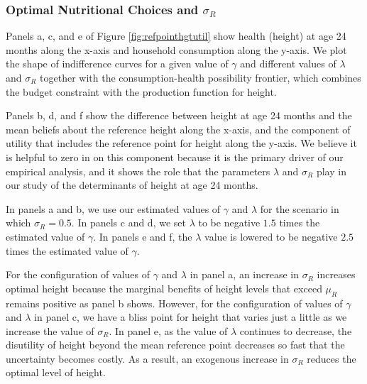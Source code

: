 \subsubsection{Optimal Nutritional Choices and $\sigma_R$\label{sec:sigmaopti}}

Panels a, c, and e of Figure \ref{fig:refpointhgtutil} show health (height) at age 24 months along the x-axis and household consumption along the y-axis. We plot the shape of indifference curves for a given value of $\gamma$ and different values of $\lambda$ and $\sigma_R$ together with the consumption-health possibility frontier, which combines the budget constraint with the production function for height.

Panels b, d, and f show the difference between height at age 24 months and the mean beliefs about the reference height along the x-axis, and the component of utility that  includes the reference point for height along the y-axis. We believe it is helpful to zero in on this component because it is the primary driver of our empirical analysis, and it shows the role that the parameters $\lambda$ and $\sigma_R$ play in our study of the determinants of height at age 24 months.

In panels a and b, we use our estimated values of $\gamma$ and $\lambda$ for the scenario in which $\sigma_R = 0.5$. In panels c and d, we set $\lambda$ to be negative $1.5$ times the estimated value of $\gamma$. In panels e and f, the $\lambda$ value is lowered to be negative $2.5$ times the estimated value of $\gamma$.

For the configuration of values of $\gamma$ and $\lambda$ in panel a, an increase in $\sigma_R$ increases optimal height because the marginal benefits of height levels that exceed $\mu_{R}$ remains positive as panel b shows. However, for the configuration of values of $\gamma$ and $\lambda$ in panel c, we have a bliss point for height that varies just a little as we increase the value of $\sigma_R$. In panel e, as the value of $\lambda$ continues to decrease, the disutility of height beyond the mean reference point decreases so fast that the uncertainty becomes costly. As a result, an exogenous increase in $\sigma_R$ reduces the optimal level of height.

